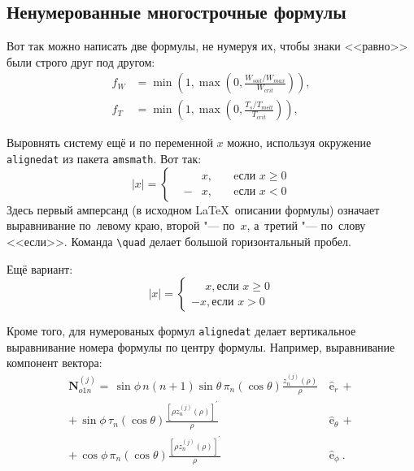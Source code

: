 \subsection{Ненумерованные многострочные формулы} \label{subsec:ch1/sec3/sub2}

Вот так можно написать две формулы, не нумеруя их, чтобы знаки <<равно>> были
строго друг под другом:
\begin{align}
  f_W & =  \min \left( 1, \max \left( 0, \frac{W_{soil} / W_{max}}{W_{crit}} \right)  \right), \nonumber \\
  f_T & =  \min \left( 1, \max \left( 0, \frac{T_s / T_{melt}}{T_{crit}} \right)  \right), \nonumber
\end{align}

Выровнять систему ещё и по переменной $ x $ можно, используя окружение
\verb|alignedat| из пакета \verb|amsmath|. Вот так:
\[
    |x| = \left\{
    \begin{alignedat}{2}
        &&x, \quad &\text{eсли } x\geqslant 0 \\
        &-&x, \quad & \text{eсли } x<0
    \end{alignedat}
    \right.
\]
Здесь первый амперсанд (в исходном \LaTeX\ описании формулы) означает
выравнивание по~левому краю, второй "--- по~$ x $, а~третий "--- по~слову
<<если>>. Команда \verb|\quad| делает большой горизонтальный пробел.

Ещё вариант:
\[
    |x|=
    \begin{cases}
    \phantom{-}x, \text{если } x \geqslant 0 \\
    -x, \text{если } x>0
    \end{cases}
\]

Кроме того, для  нумерованых формул \verb|alignedat| делает вертикальное
выравнивание номера формулы по центру формулы. Например, выравнивание
компонент вектора:
\begin{equation}
 \label{eq:2p3}
 \begin{alignedat}{2}
{\mathbf{N}}_{o1n}^{(j)} = \,{\sin} \phi\,n\!\left(n+1\right)
         {\sin}\theta\,
         \pi_n\!\left({\cos} \theta\right)
         \frac{
               z_n^{(j)}\!\left( \rho \right)
              }{\rho}\,
           &{\boldsymbol{\hat{\mathrm e}}}_{r}\,+   \\
+\,
{\sin} \phi\,
         \tau_n\!\left({\cos} \theta\right)
         \frac{
            \left[\rho z_n^{(j)}\!\left( \rho \right)\right]^{\prime}
              }{\rho}\,
            &{\boldsymbol{\hat{\mathrm e}}}_{\theta}\,+   \\
+\,
{\cos} \phi\,
         \pi_n\!\left({\cos} \theta\right)
         \frac{
            \left[\rho z_n^{(j)}\!\left( \rho \right)\right]^{\prime}
              }{\rho}\,
            &{\boldsymbol{\hat{\mathrm e}}}_{\phi}\:.
\end{alignedat}
\end{equation}

